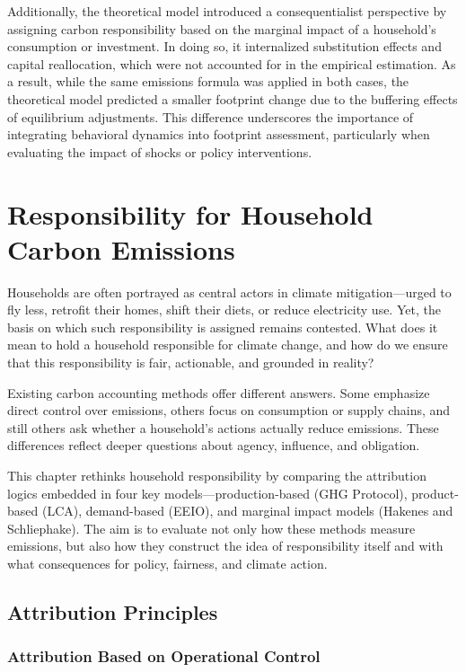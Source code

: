 \documentclass[12pt,a4paper]{article}%
\begin{document}
Additionally, the theoretical model introduced a consequentialist perspective by assigning carbon responsibility based on the marginal impact of a household's consumption or investment. In doing so, it internalized substitution effects and capital reallocation, which were not accounted for in the empirical estimation. As a result, while the same emissions formula was applied in both cases, the theoretical model predicted a smaller footprint change due to the buffering effects of equilibrium adjustments. This difference underscores the importance of integrating behavioral dynamics into footprint assessment, particularly when evaluating the impact of shocks or policy interventions.


\section{Responsibility for Household Carbon Emissions}

Households are often portrayed as central actors in climate mitigation—urged to fly less, retrofit their homes, shift their diets, or reduce electricity use. Yet, the basis on which such responsibility is assigned remains contested. What does it mean to hold a household responsible for climate change, and how do we ensure that this responsibility is fair, actionable, and grounded in reality?

Existing carbon accounting methods offer different answers. Some emphasize direct control over emissions, others focus on consumption or supply chains, and still others ask whether a household’s actions actually reduce emissions. These differences reflect deeper questions about agency, influence, and obligation. 

This chapter rethinks household responsibility by comparing the attribution logics embedded in four key models—production-based (GHG Protocol), product-based (LCA), demand-based (EEIO), and marginal impact models (Hakenes and Schliephake). The aim is to evaluate not only how these methods measure emissions, but also how they construct the idea of responsibility itself and with what consequences for policy, fairness, and climate action.

\subsection{Attribution Principles}

\subsubsection{Attribution Based on Operational Control}
\end{document}
